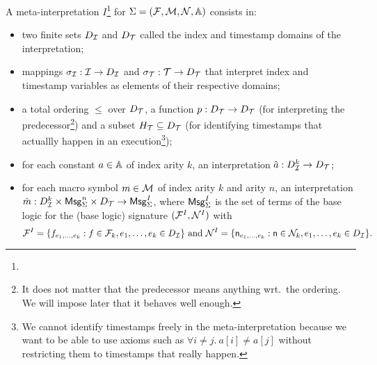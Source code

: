 \begin{definition}
  A meta-interpretation $I$\footnote{}
  for $\Sigma = (\mathcal{F},\mathcal{M},\mathcal{N},\mathbb{A})$ consists in:
  \begin{itemize}
    \item two finite sets $D_{\mathcal{I}}$ and $D_{\mathcal{T}}$ called the index and timestamp
      domains of the interpretation;
    \item mappings $\sigma_{\mathcal{I}} : \mathcal{I} \to D_{\mathcal{I}}$
      and $\sigma_{\mathcal{T}} : \mathcal{T} \to D_{\mathcal{T}}$ that interpret index and
      timestamp variables as elements of their respective domains;
    \item a total ordering $\leq$ over $D_{\mathcal{T}}$,
      a function $p : D_{\mathcal{T}} \to D_{\mathcal{T}}$ (for interpreting the
      predecessor\footnote{
        It does not matter that the predecessor means anything
        wrt.\ the ordering. We will impose later that it behaves
        well enough.
      })
      and a subset $H_{\mathcal{T}}\subseteq D_{\mathcal{T}}$ (for identifying timestamps
      that actuallly happen in an execution\footnote{
        We cannot identify timestamps freely in the meta-interpretation
        because we want to be able to use axioms such as
        $\forall i\neq j.~ a[i] \neq a[j]$ without restricting
        them to timestamps that really happen.
      });
    \item for each constant $a \in \mathbb{A}$ of index arity $k$,
      an interpretation $\hat{a} : D_{\mathcal{I}}^k \to D_{\mathcal{T}}$;
    \item for each macro symbol $m \in \mathcal{M}$ of index
      arity $k$ and arity $n$, an interpretation
      $\hat{m} : D_{\mathcal{I}}^k \times \mathsf{Msg}_\Sigma^n \times D_{\mathcal{T}} \to \mathsf{Msg}^I_\Sigma$,
      where $\mathsf{Msg}^I_\Sigma$ is the set of terms of the base
      logic for the (base logic) signature
      $(\mathcal{F}^I,\mathcal{N}^I)$ with
      \[
        \mathcal{F}^I =
        \{ f_{e_1,\ldots,e_k} : f \in \mathcal{F}_k, e_1,\ldots,e_k \in D_{\mathcal{I}} \}
        \text{ and }
        \mathcal{N}^I = \{ \mathsf{n}_{e_1,\ldots,e_k} : \mathsf{n}\in\mathcal{N}_k,
        e_1,\ldots,e_k\in D_{\mathcal{I}} \}.
      \]
  \end{itemize}
\end{definition}

